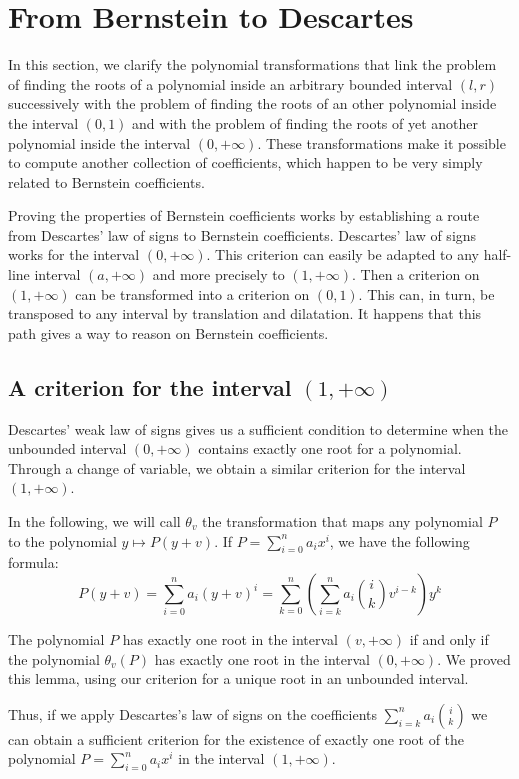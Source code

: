 \documentclass{mscs}
\begin{document}
\section{From Bernstein to Descartes}\label{sec:Bernstein}
In this section, we clarify the polynomial transformations that link
the problem of finding the roots of a polynomial inside an arbitrary
bounded interval \((l,r)\) successively with the problem of finding
the roots of an other polynomial inside the interval \((0,1)\) and
with the problem of finding the roots of yet another polynomial inside
the interval \((0,+\infty)\).  These transformations make it possible to
compute another collection of coefficients, which happen to be very simply
related to Bernstein coefficients.

Proving the properties of Bernstein coefficients works by establishing
a route from Descartes' law of signs to Bernstein coefficients.  Descartes'
law of signs works for the interval \((0,+\infty)\).  This criterion
can easily be adapted to any half-line interval \((a,+\infty)\) and
more precisely to \((1,+\infty)\).  Then a criterion on \((1,+\infty)\)
can be transformed into a criterion on \((0,1)\). This can, in turn,
be transposed to any interval by translation and dilatation.  It
happens that this path gives a way to
reason on Bernstein coefficients.
\subsection{A criterion for the interval \((1,+\infty)\)}
Descartes' weak law of signs gives us a sufficient condition to
determine when the
unbounded interval \((0,+\infty)\) contains exactly one root for a
polynomial. Through a change of variable, we obtain a similar
criterion for the interval \((1, +\infty)\).

In the following, we will call \(\theta_v\) the transformation that
maps any polynomial \(P\) to the polynomial \(y \mapsto P(y+v)\).  If
\(P=\sum_{i=0}^n a_i x^i\), we have the following formula:
\[P(y+v)= \sum_{i=0}^{n} a_i (y+v)^i = \sum_{k=0}^{n}
(\sum_{i=k}^{n}a_i\binom{i}{k}v^{i-k}) y^k\]

The polynomial \(P\) has exactly one root in the interval \((v,+\infty)\)
if  and only if
the polynomial \(\theta_v(P)\) has exactly one root in the interval
\((0,+\infty)\).  %
We proved this lemma, using our criterion for a unique root
in an unbounded interval.

Thus, if we apply Descartes's law of signs on the coefficients
\(\sum_{i=k}^{n}a_i\binom{i}{k}\)
 we
can obtain a sufficient criterion for the existence of exactly one
root of the polynomial \(P=\sum_{i=0}^{n}a_ix^i\) in the interval
\((1,+\infty)\).
\end{document}
